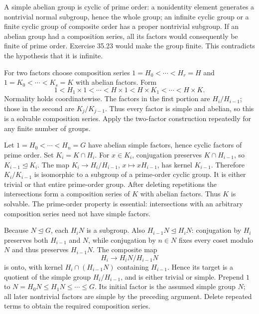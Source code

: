 A simple abelian group is cyclic of prime order: a nonidentity element generates a nontrivial normal subgroup, hence the whole group; an infinite cyclic group or a finite cyclic group of composite order has a proper nontrivial subgroup.
If an abelian group had a composition series, all its factors would consequently be finite of prime order. Exercise 35.23 would make the group finite. This contradicts the hypothesis that it is infinite.

For two factors choose composition series $1=H_0<\cdots<H_r=H$ and $1=K_0<\cdots<K_s=K$ with abelian factors. Form
\[
1<H_1\times1<\cdots<H\times1
<H\times K_1<\cdots<H\times K.
\]
Normality holds coordinatewise. The factors in the first portion are $H_i/H_{i-1}$; those in the second are $K_j/K_{j-1}$. Thus every factor is simple and abelian, so this is a solvable composition series. Apply the two-factor construction repeatedly for any finite number of groups.

Let $1=H_0<\cdots<H_n=G$ have abelian simple factors, hence cyclic factors of prime order. Set $K_i=K\cap H_i$.
For $x\in K_i$, conjugation preserves $K\cap H_{i-1}$, so $K_{i-1}\trianglelefteq K_i$.
The map $K_i\to H_i/H_{i-1}$, $x\mapsto xH_{i-1}$, has kernel $K_{i-1}$.
Therefore $K_i/K_{i-1}$ is isomorphic to a subgroup of a prime-order cyclic group. It is either trivial or that entire prime-order group.
After deleting repetitions the intersections form a composition series of $K$ with abelian factors. Thus $K$ is solvable. The prime-order property is essential: intersections with an arbitrary composition series need not have simple factors.

Because $N\trianglelefteq G$, each $H_iN$ is a subgroup.
Also $H_{i-1}N\trianglelefteq H_iN$: conjugation by $H_i$ preserves both $H_{i-1}$ and $N$, while conjugation by $n\in N$ fixes every coset modulo $N$ and thus preserves $H_{i-1}N$.
The composite map
\[
H_i\longrightarrow H_iN/H_{i-1}N
\]
is onto, with kernel $H_i\cap(H_{i-1}N)$ containing $H_{i-1}$. Hence its target is a quotient of the simple group $H_i/H_{i-1}$, and is either trivial or simple.
Prepend $1$ to $N=H_0N\le H_1N\le\cdots\le G$.
Its initial factor is the assumed simple group $N$; all later nontrivial factors are simple by the preceding argument. Delete repeated terms to obtain the required composition series.

